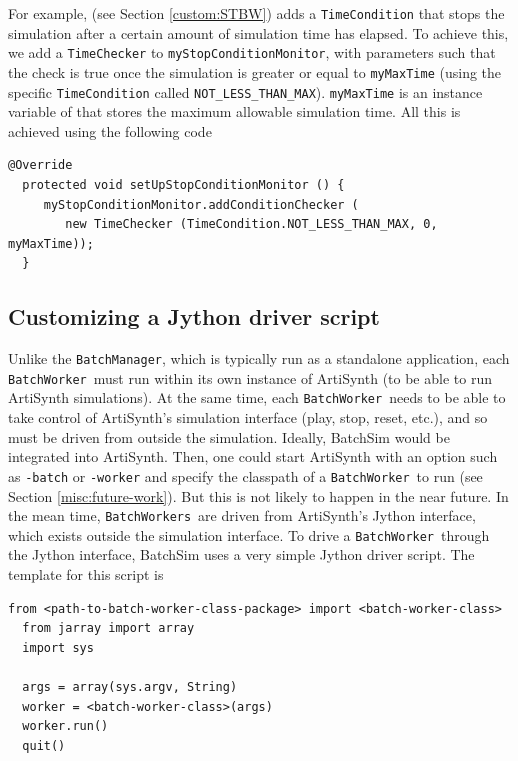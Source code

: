 \documentclass{article}
\newcommand{\BM}{{\tt BatchManager}}
\newcommand{\BW}{{\tt BatchWorker}}
\newcommand{\BWs}{{\tt BatchWorkers}}
\begin{document}
For example,  (see Section \ref{custom:STBW}) adds a {\tt TimeCondition} that stops the simulation after a certain amount of simulation time has elapsed. To achieve this, we add a {\tt TimeChecker} to {\tt myStopConditionMonitor}, with parameters such that the check is true once the simulation is greater or equal to {\tt myMaxTime} (using the specific {\tt TimeCondition} called {\tt NOT\_LESS\_THAN\_MAX}). {\tt myMaxTime}  is an instance variable of  that stores the maximum allowable simulation time. All this is achieved using the following code

\begin{lstlisting}[]
  @Override
  protected void setUpStopConditionMonitor () {
     myStopConditionMonitor.addConditionChecker (
        new TimeChecker (TimeCondition.NOT_LESS_THAN_MAX, 0, myMaxTime));
  }
\end{lstlisting}

\subsection{Customizing a Jython driver script}
\label{custom:jython}

Unlike the \BM, which is typically run as a standalone application, each \BW\ must run within its own instance of ArtiSynth (to be able to run ArtiSynth simulations). At the same time, each \BW\ needs to be able to take control of ArtiSynth's simulation interface (play, stop, reset, etc.), and so must be driven from outside the simulation. Ideally, BatchSim would be integrated into ArtiSynth. Then, one could start ArtiSynth with an option such as {\tt -batch} or {\tt -worker} and specify the classpath of a \BW\ to run (see Section \ref{misc:future-work}). But this is not likely to happen in the near future. In the mean time, \BWs\ are driven from ArtiSynth's Jython interface, which exists outside the simulation interface. To drive a \BW\ through the Jython interface, BatchSim uses a very simple Jython driver script. The template for this script is

\begin{lstlisting}[]
  from <path-to-batch-worker-class-package> import <batch-worker-class>
  from jarray import array
  import sys

  args = array(sys.argv, String)
  worker = <batch-worker-class>(args)
  worker.run()
  quit()
\end{lstlisting}
\end{document}
